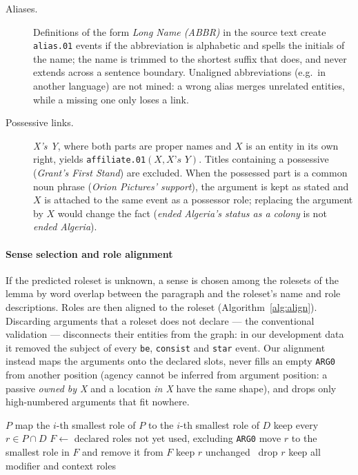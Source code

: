\documentclass[preprint,12pt,authoryear]{elsarticle}
\begin{document}
\begin{description}
\item[Aliases.] Definitions of the form \textit{Long Name (ABBR)} in the source text create \texttt{alias.01} events if the abbreviation is alphabetic and spells the initials of the name; the name is trimmed to the shortest suffix that does, and never extends across a sentence boundary. Unaligned abbreviations (e.g.\ in another language) are not mined: a wrong alias merges unrelated entities, while a missing one only loses a link.
\item[Possessive links.] \textit{X's Y}, where both parts are proper names and $X$ is an entity in its own right, yields \texttt{affiliate.01}$(X, \textit{X's Y})$. Titles containing a possessive (\textit{Grant's First Stand}) are excluded. When the possessed part is a common noun phrase (\textit{Orion Pictures' support}), the argument is kept as stated and $X$ is attached to the same event as a possessor role; replacing the argument by $X$ would change the fact (\textit{ended Algeria's status as a colony} is not \textit{ended Algeria}).
\end{description}

\paragraph{Sense selection and role alignment}
If the predicted roleset is unknown, a sense is chosen among the rolesets of the lemma by word overlap between the paragraph and the roleset's name and role descriptions.
Roles are then aligned to the roleset (Algorithm~\ref{alg:align}).
Discarding arguments that a roleset does not declare --- the conventional validation --- disconnects their entities from the graph: in our development data it removed the subject of every \texttt{be}, \texttt{consist} and \texttt{star} event.
Our alignment instead maps the arguments onto the declared slots, never fills an empty \texttt{ARG0} from another position (agency cannot be inferred from argument position: a passive \textit{owned by X} and a location \textit{in X} have the same shape), and drops only high-numbered arguments that fit nowhere.

\begin{algorithm}[t]
\caption{Role alignment of proposed core roles $P$ to the declared core roles $D$ of a roleset.}
\label{alg:align}
\begin{algorithmic}[1]
 \Return $P$ \EndIf
{} 
  \State map the $i$-th smallest role of $P$ to the $i$-th smallest role of $D$
\Else
  \State keep every $r \in P \cap D$
  \State $F \gets$ declared roles not yet used, excluding \texttt{ARG0}
     move $r$ to the smallest role in $F$ and remove it from $F$
     keep $r$ unchanged
    \Else\ drop $r$
    \EndIf
  \EndFor
\EndIf
\State keep all modifier and context roles
\end{algorithmic}
\end{algorithm}
\end{document}
